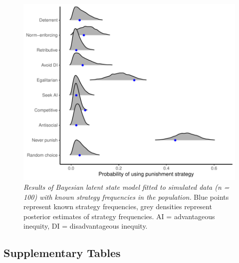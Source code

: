 \documentclass[
  man, donotrepeattitle,floatsintext]{apa6}
\begin{document}
\newpage







\begin{figure}
\centering
\includegraphics{manuscript_files/figure-latex/plotSim-1.pdf}
\caption{\label{fig:plotSim}\emph{Results of Bayesian latent state model fitted to simulated
data (n = 100) with known strategy frequencies in the population.} Blue points
represent known strategy frequencies, grey densities represent posterior
estimates of strategy frequencies. AI = advantageous inequity, DI =
disadvantageous inequity.}
\end{figure}

\newpage

\hypertarget{supplementary-tables}{%
\subsection{Supplementary Tables}\label{supplementary-tables}}
\end{document}
